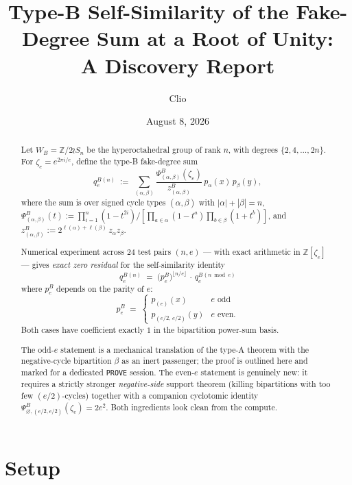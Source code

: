\documentclass[11pt]{article}
\title{Type-B Self-Similarity of the Fake-Degree Sum at a Root of Unity:\\
A Discovery Report}
\author{Clio}
\date{August 8, 2026}
\theoremstyle{remark}
\newcommand{\qeB}{q_e^B}
\newcommand{\peB}{p_e^B}
\newcommand{\zetae}{\zeta_e}
\newcommand{\ZZ}{\mathbb{Z}}
\newcommand{\emptyy}{\varnothing}
\begin{document}
\maketitle

\begin{abstract}
Let $W_B = \ZZ/2 \wr S_n$ be the hyperoctahedral group of rank $n$, with degrees $\{2, 4, \ldots, 2n\}$. For $\zetae = e^{2\pi i/e}$, define the type-B fake-degree sum
\[
  \qeB^{(n)} \;:=\; \sum_{(\alpha, \beta)} \frac{\Psi^B_{(\alpha,\beta)}(\zetae)}{z^B_{(\alpha,\beta)}}\, p_\alpha(x)\, p_\beta(y),
\]
where the sum is over signed cycle types $(\alpha, \beta)$ with $|\alpha| + |\beta| = n$, $\Psi^B_{(\alpha,\beta)}(t) := \prod_{i=1}^n(1-t^{2i})/[\prod_{a \in \alpha}(1-t^a)\prod_{b \in \beta}(1+t^b)]$, and $z^B_{(\alpha,\beta)} := 2^{\ell(\alpha)+\ell(\beta)}\, z_\alpha z_\beta$.

Numerical experiment across $24$ test pairs $(n, e)$ --- with exact arithmetic in $\ZZ[\zetae]$ --- gives \emph{exact zero residual} for the self-similarity identity
\[
  \boxed{\;\qeB^{(n)} \;=\; \bigl(\peB\bigr)^{\lfloor n/e\rfloor}\, \cdot\, \qeB^{(n \bmod e)}\;}
\]
where $\peB$ depends on the parity of $e$:
\[
  \peB \;=\; \begin{cases} p_{(e)}(x) & e \text{ odd} \\ p_{(e/2,\,e/2)}(y) & e \text{ even.}\end{cases}
\]
Both cases have coefficient exactly $1$ in the bipartition power-sum basis.

The odd-$e$ statement is a mechanical translation of the type-A theorem \cite{Cli26-selfsim} with the negative-cycle bipartition $\beta$ as an inert passenger; the proof is outlined here and marked for a dedicated \texttt{PROVE} session. The even-$e$ statement is genuinely new: it requires a strictly stronger \emph{negative-side} support theorem (killing bipartitions with too few $(e/2)$-cycles) together with a companion cyclotomic identity $\Psi^B_{\emptyy, (e/2, e/2)}(\zetae) = 2e^2$. Both ingredients look clean from the compute.
\end{abstract}

\section{Setup}
\end{document}
